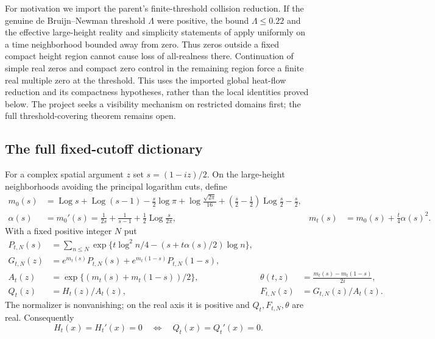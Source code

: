 \documentclass[11pt]{article}
\theoremstyle{definition}
\theoremstyle{remark}
\DeclareMathOperator{\Log}{Log}
\begin{document}
For motivation we import the parent's finite-threshold collision reduction.
If the genuine de Bruijn--Newman threshold $\Lambda$ were positive,
the bound $\Lambda\le0.22$ and the effective large-height reality and
simplicity statements of \cite[Theorem~1.5(i),(ii)]{polymath} apply
uniformly on a time neighborhood bounded away from zero. Thus zeros
outside a fixed compact height region cannot cause loss of all-realness
there. Continuation of simple real zeros
\cite[Proposition~3.1(i)]{polymath} and compact zero control in the
remaining region force a finite real multiple zero at the threshold.
This uses the imported global heat-flow reduction and its compactness
hypotheses, rather than the local identities proved below. The project
seeks a visibility mechanism on restricted domains first; the full
threshold-covering theorem remains open.

\subsection{The full fixed-cutoff dictionary}

For a complex spatial argument $z$ set $s=(1-iz)/2$. On the large-height
neighborhoods avoiding the principal logarithm cuts, define
\begin{align}
 m_0(s)&=\Log s+\Log(s-1)-\tfrac{s}{2}\log\pi
  +\log\frac{\sqrt{2\pi}}{16}
  +(\tfrac{s}{2}-\tfrac12)\Log\tfrac{s}{2}-\tfrac{s}{2},\label{eq:m0}\\
 \alpha(s)&=m_0'(s)=\frac1{2s}+\frac1{s-1}
                  +\frac12\Log\frac{s}{2\pi},
 &m_t(s)&=m_0(s)+\frac t4\alpha(s)^2.\nonumber
\end{align}
With a fixed positive integer $N$ put
\begin{align}
 P_{t,N}(s)&=\sum_{n\le N}
  \exp\{t\log^2n/4-(s+t\alpha(s)/2)\log n\},\nonumber\\
 G_{t,N}(z)&=e^{m_t(s)}P_{t,N}(s)
            +e^{m_t(1-s)}P_{t,N}(1-s),\nonumber\\
 A_t(z)&=\exp\{(m_t(s)+m_t(1-s))/2\},
 &\theta(t,z)&=\frac{m_t(s)-m_t(1-s)}{2i},\label{eq:normalizer}\\
 Q_t(z)&=H_t(z)/A_t(z),
 &F_{t,N}(z)&=G_{t,N}(z)/A_t(z).\nonumber
\end{align}
The normalizer is nonvanishing; on the real axis it is positive and
$Q_t,F_{t,N},\theta$ are real. Consequently
\begin{equation}
 H_t(x)=H_t'(x)=0\quad\Longleftrightarrow\quad
 Q_t(x)=Q_t'(x)=0.
 \label{eq:normalizer-zero}
\end{equation}
\end{document}
